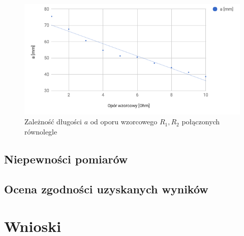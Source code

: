 \documentclass[a4paper,10pt,twoside]{article}
\begin{document}
\begin{figure}[!htp]
\centerline{\includegraphics[scale=0.5]{wykres_r1_r2_par.png}}
\caption{Zależność długości $a$ od oporu wzorcowego $R_1, R_2$ połączonych równolegle}
\label{fig:wykres_r1_r2_par}
\end{figure}


\subsection{Niepewności pomiarów}

\subsection{Ocena zgodności uzyskanych wyników}

\section{Wnioski}
\end{document}
